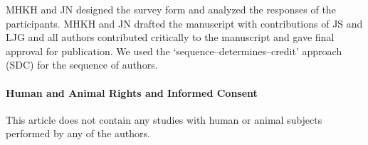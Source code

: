 \documentclass[smallextended]{svjour3}       %
\begin{document}
MHKH and JN designed the survey form and analyzed the responses of the participants.
MHKH and JN drafted the manuscript with contributions of JS and LJG and all authors contributed critically to the manuscript and gave final approval for publication.
We used the `sequence--determines--credit' approach (SDC) for the sequence of authors.

\hypertarget{human-and-animal-rights-and-informed-consent}{%
\paragraph{Human and Animal Rights and Informed Consent}\label{human-and-animal-rights-and-informed-consent}}

This article does not contain any studies with human or animal subjects performed by any of the authors.



\end{document}
